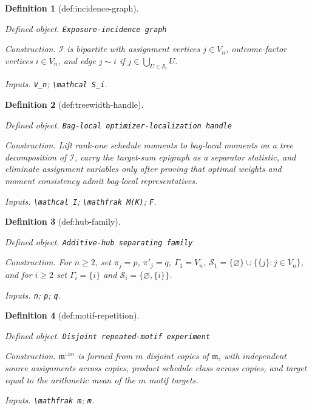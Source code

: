 \documentclass{article}
\newtheorem{definition}{Definition}
\begin{document}
\begin{definition}[def:incidence-graph]\label{def:incidence-graph}
\par\smallskip\noindent\emph{Defined object.} \texttt{Exposure-\allowbreak{}incidence graph}
\par\smallskip\noindent\emph{Construction.} \(\mathcal I\) is bipartite with assignment vertices \(j\in V_n\), outcome-factor vertices \(i\in V_n\), and edge \(j\sim i\) if \(j\in\bigcup_{U\in\mathcal S_i}U\).
\par\smallskip\noindent\emph{Inputs.} \texttt{V\_\allowbreak{}n}; \texttt{\textbackslash{}\allowbreak{}mathcal S\_\allowbreak{}i}.
\end{definition}

\begin{definition}[def:treewidth-handle]\label{def:treewidth-handle}
\par\smallskip\noindent\emph{Defined object.} \texttt{Bag-\allowbreak{}local optimizer-\allowbreak{}localization handle}
\par\smallskip\noindent\emph{Construction.} Lift rank-one schedule moments to bag-local moments on a tree decomposition of \(\mathcal I\), carry the target-sum epigraph as a separator statistic, and eliminate assignment variables only after proving that optimal weights and moment consistency admit bag-local representatives.
\par\smallskip\noindent\emph{Inputs.} \texttt{\textbackslash{}\allowbreak{}mathcal I}; \texttt{\textbackslash{}\allowbreak{}mathfrak M(K)}; \texttt{F}.
\end{definition}

\begin{definition}[def:hub-family]\label{def:hub-family}
\par\smallskip\noindent\emph{Defined object.} \texttt{Additive-\allowbreak{}hub separating family}
\par\smallskip\noindent\emph{Construction.} For \(n\ge2\), set \(\pi_j=p\), \(\pi'_j=q\), \(\Gamma_1=V_n\), \(\mathcal S_1=\{\varnothing\}\cup\{\{j\}:j\in V_n\}\), and for \(i\ge2\) set \(\Gamma_i=\{i\}\) and \(\mathcal S_i=\{\varnothing,\{i\}\}\).
\par\smallskip\noindent\emph{Inputs.} \texttt{n}; \texttt{p}; \texttt{q}.
\end{definition}

\begin{definition}[def:motif-repetition]\label{def:motif-repetition}
\par\smallskip\noindent\emph{Defined object.} \texttt{Disjoint repeated-\allowbreak{}motif experiment}
\par\smallskip\noindent\emph{Construction.} \(\mathfrak m^{\sqcup m}\) is formed from \(m\) disjoint copies of \(\mathfrak m\), with independent source assignments across copies, product schedule class across copies, and target equal to the arithmetic mean of the \(m\) motif targets.
\par\smallskip\noindent\emph{Inputs.} \texttt{\textbackslash{}\allowbreak{}mathfrak m}; \texttt{m}.
\end{definition}
\end{document}
